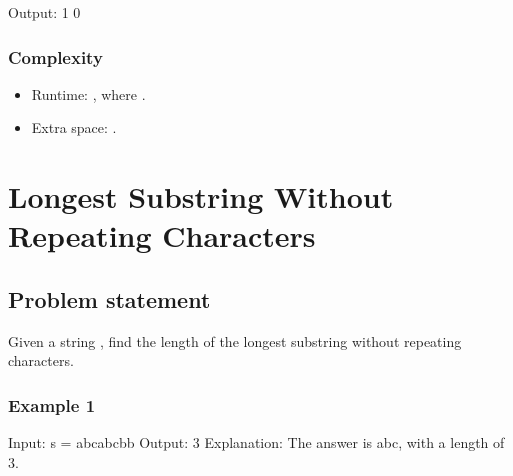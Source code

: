 \documentclass[letterpaper,12pt,english]{book}
\begin{document}
\begin{sphinxVerbatim}[commandchars=\\\{\}]
Output:
1
0
\end{sphinxVerbatim}


\subsubsection{Complexity}
\label{\detokenize{String/08_STR_242_Valid_Anagram:id4}}\begin{itemize}
\item {} 
\sphinxAtStartPar
Runtime: , where .

\item {} 
\sphinxAtStartPar
Extra space: .

\end{itemize}

\sphinxstepscope


\section{Longest Substring Without Repeating Characters}
\label{\detokenize{String/08_STR_3_Longest_Substring_Without_Repeating_Characters:longest-substring-without-repeating-characters}}\label{\detokenize{String/08_STR_3_Longest_Substring_Without_Repeating_Characters::doc}}

\subsection{Problem statement\sphinxfootnotemark[29]}
\label{\detokenize{String/08_STR_3_Longest_Substring_Without_Repeating_Characters:problem-statement}}%
\begin{footnotetext}[29]\sphinxAtStartFootnote
{}
%
\end{footnotetext}\ignorespaces 
\sphinxAtStartPar
Given a string , find the length of the longest substring without repeating characters.


\subsubsection{Example 1}
\label{\detokenize{String/08_STR_3_Longest_Substring_Without_Repeating_Characters:example-1}}
\begin{sphinxVerbatim}[commandchars=\\\{\}]
Input: s = \PYGZdq{}abcabcbb\PYGZdq{}
Output: 3
Explanation: The answer is \PYGZdq{}abc\PYGZdq{}, with a length of 3.
\end{sphinxVerbatim}
\end{document}
